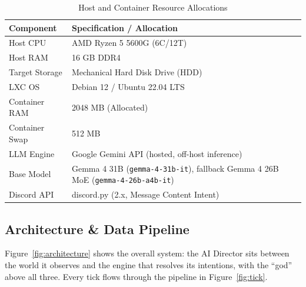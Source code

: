 \documentclass[10pt,a4paper]{article}
\begin{document}
\begin{table}[htbp]
\centering
\caption{Host and Container Resource Allocations}
\label{tab:hardware}
\begin{tabular}{@{}ll@{}}
\toprule
\textbf{Component} & \textbf{Specification / Allocation} \\
\midrule
Host CPU & AMD Ryzen 5 5600G (6C/12T) \\
Host RAM & 16 GB DDR4 \\
Target Storage & Mechanical Hard Disk Drive (HDD) \\
LXC OS & Debian 12 / Ubuntu 22.04 LTS \\
Container RAM & 2048 MB (Allocated) \\
Container Swap & 512 MB \\
LLM Engine & Google Gemini API (hosted, off-host inference) \\
Base Model & Gemma 4 31B (\texttt{gemma-4-31b-it}), fallback Gemma 4 26B MoE (\texttt{gemma-4-26b-a4b-it}) \\
Discord API & discord.py (2.x, Message Content Intent) \\
\bottomrule
\end{tabular}
\end{table}

\subsection{Architecture \& Data Pipeline}
Figure~\ref{fig:architecture} shows the overall system: the AI Director sits between the world it observes and the engine that resolves its intentions, with the ``god'' above all three. Every tick flows through the pipeline in Figure~\ref{fig:tick}.
\end{document}
